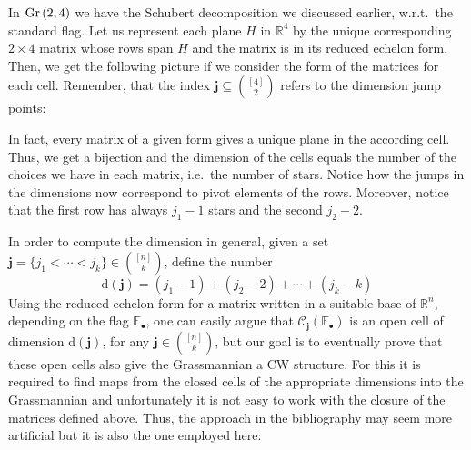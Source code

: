 \begin{example} In $\Gr{2}{4}$ we have the Schubert decomposition we discussed earlier, w.r.t.\ the standard flag. Let us represent each plane $H$ in $\mathbb{R}^4$ by the unique corresponding $2\times 4$ matrix whose rows span $H$ and the matrix is in its reduced echelon form. Then, we get the following picture if we consider the form of the matrices for each cell. Remember, that the index $\mathbf{j}\subseteq\binom{[4]}{2}$ refers to the dimension jump points:
\begin{center}
\end{center}
In fact, every matrix of a given form gives a unique plane in the according cell. Thus, we get a bijection and the dimension of the cells equals the number of the choices we have in each matrix, i.e.\ the number of stars. Notice how the jumps in the dimensions now correspond to pivot elements of the rows. Moreover, notice that the first row has always $j_1-1$ stars and the second $j_2-2$.
\end{example}

In order to compute the dimension in general, given a set $\mathbf{j}=\{j_1<\cdots<j_k\}\in\binom{[n]}{k}$, define the number
\[\mathrm{d}(\mathbf{j})=(j_1-1)+(j_2-2)+\cdots+(j_k-k)\]
Using the reduced echelon form for a matrix written in a suitable base of $\mathbb{R}^n$, depending on the flag $\mathbb{F}_{\bullet}$, one can easily argue that $\mathcal{C}_{\mathbf{j}}\left(\mathbb{F}_{\bullet}\right)$ is an open cell of dimension $\mathrm{d}(\mathbf{j})$, for any $\mathbf{j}\in\binom{[n]}{k}$, but our goal is to eventually prove that these open cells also give the Grassmannian a CW structure. For this it is required to find maps from the closed cells of the appropriate dimensions into the Grassmannian and unfortunately it is not easy to work with the closure of the matrices defined above. Thus, the approach in the bibliography may seem more artificial but it is also the one employed here:

